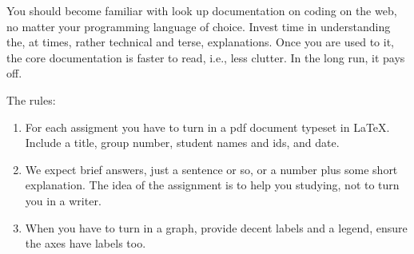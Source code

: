 You should become familiar with look up documentation on coding on the web, no matter your programming language of choice. Invest time in understanding the, at times, rather technical and terse, explanations.  Once you are used to it, the core documentation is faster to read, i.e., less clutter. In the long run, it pays off.



The rules:
\begin{enumerate}
\item For each assigment you have to turn in a pdf document typeset in \LaTeX{}. Include a title, group number, student names and ids, and date.
\item We expect brief answers, just a sentence or so, or a number plus some short explanation. The idea of the assignment is to help you studying, not to turn you in a writer.
\item When you have to turn in a graph, provide decent labels and a legend, ensure the axes have labels too.
\end{enumerate}
